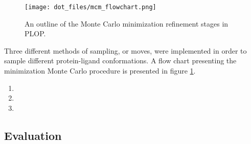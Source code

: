 \begin{figure}[hp]
\centering
\texttt{[image: dot\_files/mcm\_flowchart.png]}
\caption{An outline of the Monte Carlo minimization refinement stages in PLOP.}
\label{figure:mcm_flowchart}
\end{figure}

Three different methods of sampling, or moves, were implemented in order to sample different protein-ligand conformations.
A flow chart presenting the minimization Monte Carlo procedure is presented in figure \ref{figure:mcm_flowchart}.
\begin{enumerate}
\item 
\item 
\item 
\end{enumerate}

\subsection{Evaluation}
\label{subsection:p450/evaluation}

